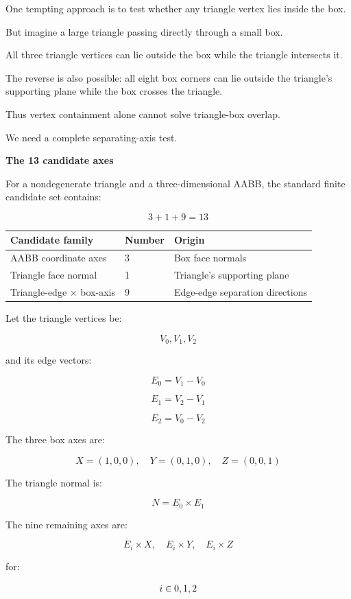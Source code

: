 One tempting approach is to test whether any triangle vertex lies inside the box.

But imagine a large triangle passing directly through a small box.

All three triangle vertices can lie outside the box while the triangle intersects it.

The reverse is also possible: all eight box corners can lie outside the triangle's supporting plane while the box crosses the triangle.

Thus vertex containment alone cannot solve triangle-box overlap.

We need a complete separating-axis test.

\textbf{The 13 candidate axes}

For a nondegenerate triangle and a three-dimensional AABB, the standard finite candidate set contains:

\[
\boxed{ 3+1+9=13 }
\]

{\def\LTcaptype{none} %
\begin{longtable}[]{@{}lll@{}}
\toprule\noalign{}
Candidate family & Number & Origin \\
\midrule\noalign{}
\endhead
\bottomrule\noalign{}
\endlastfoot
AABB coordinate axes & 3 & Box face normals \\
Triangle face normal & 1 & Triangle's supporting plane \\
Triangle-edge × box-axis & 9 & Edge-edge separation directions \\
\end{longtable}
}

Let the triangle vertices be:

\[
V_0,V_1,V_2
\]

and its edge vectors:

\[
E_0=V_1-V_0
\]

\[
E_1=V_2-V_1
\]

\[
E_2=V_0-V_2
\]

The three box axes are:

\[
X=(1,0,0),\quad Y=(0,1,0),\quad Z=(0,0,1)
\]

The triangle normal is:

\[
\boxed{ N=E_0\times E_1 }
\]

The nine remaining axes are:

\[
E_i\times X,\quad E_i\times Y,\quad E_i\times Z
\]

for:

\[
i\in\\{0,1,2\\}
\]

